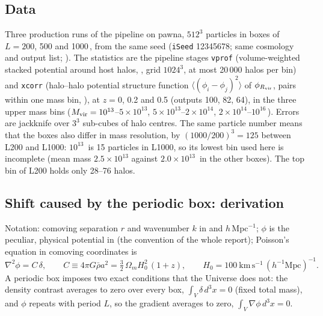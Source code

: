 
\subsection{Data}
Three production runs of the pipeline on pawna, $512^3$ particles in boxes of $L = 200$, 500 and 1000\,\Mpch, from
the same seed (\texttt{iSeed} 12345678; same cosmology and output list; ). The
statistics are the pipeline stages \texttt{vprof} (volume-weighted stacked potential around host halos,
, grid $1024^3$, at most 20\,000 halos per bin) and \texttt{xcorr} (halo--halo
potential structure function $\langle(\phi_i-\phi_j)^2\rangle$ of $\phi_{R_{\rm vir}}$, pairs within one mass bin,
), at $z = 0$, 0.2 and 0.5 (outputs 100, 82, 64), in the three upper mass bins
($M_{\rm vir}=10^{13}$--$5\times10^{13}$, $5\times10^{13}$--$2\times10^{14}$, $2\times10^{14}$--$10^{16}$\,\Msunh).
Errors are jackknife over $3^3$ sub-cubes of halo centres. The same particle number means that the boxes also differ
in mass resolution, by $(1000/200)^3 = 125$ between L200 and L1000: $10^{13}$\,\Msunh{} is 15 particles in L1000, so
its lowest bin used here is incomplete (mean mass $2.5\times10^{13}$ against $2.0\times10^{13}$\,\Msunh{} in the other
boxes). The top bin of L200 holds only 28--76 halos.

\subsection{Shift caused by the periodic box: derivation}
Notation: comoving separation $r$ and wavenumber $k$ in \Mpch{} and $h$\,Mpc$^{-1}$; $\phi$ is the peculiar, physical
potential in \kms{} (the convention of the whole report); Poisson's equation in comoving coordinates is
\begin{equation}
\nabla^2\phi = C\,\delta,\qquad C \equiv 4\pi G\bar\rho a^2 = \tfrac32\,\Omega_m H_0^2\,(1+z),\qquad
H_0 = 100~\mathrm{km\,s^{-1}}\,(h^{-1}\mathrm{Mpc})^{-1}.
\end{equation}
A periodic box imposes two exact conditions that the Universe does not: the density contrast averages to zero over
every box, $\int_V\delta\,d^3x = 0$ (fixed total mass), and $\phi$ repeats with period $L$, so the gradient averages
to zero, $\int_V\nabla\phi\,d^3x = 0$.

